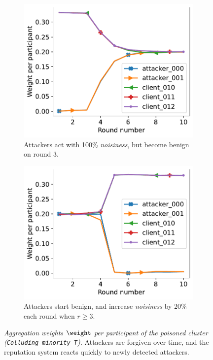 \begin{figure}[t] %
  \centering 
  \begin{subfigure}[t]{.4\linewidth}
    \centering 
    \includegraphics[trim=0 0 10pt 0,clip,width=\linewidth]{figures/reput/redemption_byzantine_min.pdf}    
    \caption{\footnotesize
      Attackers act with 100\% \emph{noisiness}, but become benign on round 3.
      \label{fig:redemption_byzantine_min}
    }
  \end{subfigure}
  \qquad
  \begin{subfigure}[t]{.4\linewidth}
    \centering 
    \includegraphics[trim=0 0 10pt 0,clip,width=\linewidth]{figures/reput/increment_byzantine_min.pdf}
    \caption{\footnotesize
      Attackers start benign, and increase \emph{noisiness} by 20\% each round when $r\geq3$.
      \label{fig:increment_byzantine_min}
    }
  \end{subfigure}
  \caption{
    \emph{Aggregation weights $\weight$ per participant of the poisoned cluster (\texttt{Colluding minority T}).}
    Attackers are forgiven over time, and the reputation system reacts quickly to newly detected attackers.
    \label{fig:redemption_decrease}
  }

\end{figure}







